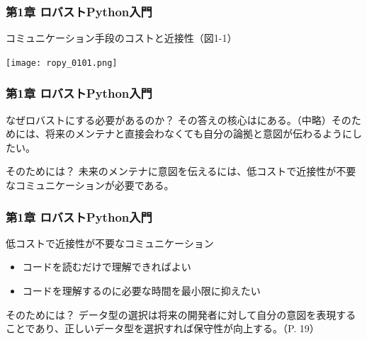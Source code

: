 \documentclass[aspectratio=169,dvipdfmx,12pt,notheorems]{beamer}
\theoremstyle{definition}
\begin{document}
\begin{frame}\frametitle{第1章 ロバストPython入門}

\begin{block}{コミュニケーション手段のコストと近接性（図1-1）}
\begin{center}
\texttt{[image: ropy\_0101.png]}
\end{center}
\end{block}
\end{frame}

\begin{frame}\frametitle{第1章 ロバストPython入門}

\begin{block}{なぜロバストにする必要があるのか？}
その答えの核心はにある。（中略）そのためには、将来のメンテナと直接会わなくても自分の論拠と意図が伝わるようにしたい。
\end{block}

\begin{block}{そのためには？}
未来のメンテナに意図を伝えるには、低コストで近接性が不要なコミュニケーションが必要である。
\end{block}

\end{frame}

\begin{frame}\frametitle{第1章 ロバストPython入門}

\begin{block}{低コストで近接性が不要なコミュニケーション}
\begin{itemize}
\item コードを読むだけで理解できればよい
\item コードを理解するのに必要な時間を最小限に抑えたい
\end{itemize}

\end{block}

\begin{block}{そのためには？}
データ型の選択は将来の開発者に対して自分の意図を表現することであり、正しいデータ型を選択すれば保守性が向上する。（P. 19）
\end{block}

\end{frame}
\end{document}
